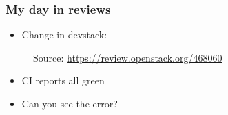 \documentclass[aspectratio=169,11pt,hyperref={colorlinks=true}]{beamer}
\begin{document}

\begin{frame}
    \frametitle{My day in reviews}
    \begin{itemize}
        \item{Change in devstack:}
    \end{itemize}
    \begin{figure}
    
    \caption{Source: \href{https://review.openstack.org/\#/c/468060/2/lib/tempest@536}{https://review.openstack.org/468060}}
    \end{figure}
    \begin{itemize}
        \item{CI reports all green}
        \item{Can you see the error?}
    \end{itemize}
\end{frame}

\end{document}
